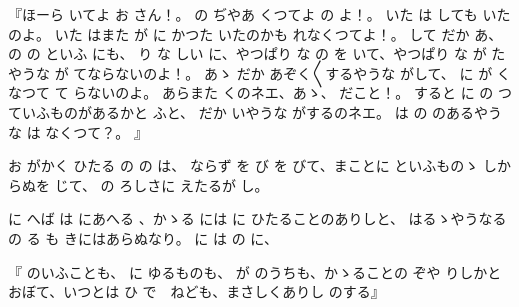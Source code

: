 『ほーら
いてよ
お
さん！。
の
ぢやあ
くつてよ
の
よ！。
いた
は
しても
いたのよ。
いた
はまた
が
に
かつた
いたのかも
れなくつてよ！。
して
だか
あ、
の
の
といふ
にも、
り
な
しい
に、やつぱり
な
の
を
いて、やつぱり
な
が
たやうな
が
てならないのよ！。
あゝ
だか
あぞく〳〵するやうな
がして、
に
が
くなつて
て
らないのよ。
あらまた
くのネエ、あゝ、
だこと！。
すると
に
の
つていふものがあるかと
ふと、
だか
いやうな
がするのネエ。
は
の
のあるやうな
は
なくつて？。
』

お
がかく
ひたる
の
の
は、
ならず
を
び
を
びて、まことに
といふものゝ
しからぬを
じて、
の
ろしさに
えたるが
し。

に
へば
は
にあへる
、かゝる
には
に
ひたることのありしと、
はるゝやうなる
の
る
も
きにはあらぬなり。
に
は
の
に、

『
のいふことも、
に
ゆるものも、
が
のうちも、かゝることの
ぞや
りしかとおぼて、いつとは
ひ
で　ねども、まさしくありし
のする』

